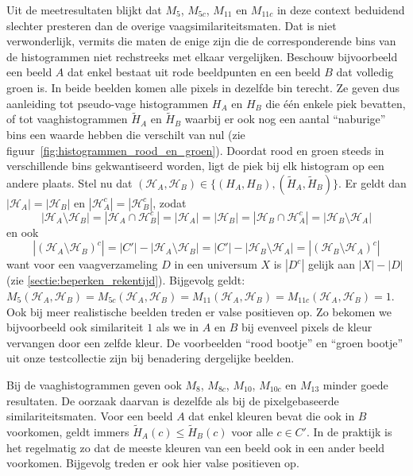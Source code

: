 Uit de meetresultaten blijkt dat $M_5$, $M_{5c}$, $M_{11}$ en $M_{11c}$ in deze context
beduidend slechter presteren dan de overige vaagsimilariteitsmaten. Dat is niet
verwonderlijk, vermits die maten de enige zijn die de corresponderende bins van de histogrammen 
niet rechstreeks met elkaar vergelijken. Beschouw bijvoorbeeld een beeld $A$ dat enkel bestaat
uit rode beeldpunten en een beeld $B$ dat volledig groen is. In beide beelden komen alle
pixels in dezelfde bin terecht. Ze geven dus aanleiding tot pseudo-vage histogrammen $H_A$ en $H_B$  
die \'e\'en enkele piek bevatten, of tot vaaghistogrammen $\widetilde{H}_A$ en $\widetilde{H}_B$ 
waarbij er ook nog een aantal ``naburige'' bins een waarde hebben die verschilt van nul 
(zie figuur~\ref{fig:histogrammen_rood_en_groen}). Doordat rood en 
groen steeds in verschillende bins gekwantiseerd worden, ligt de piek bij elk histogram op een 
andere plaats. 
Stel nu dat $(\mathcal{H}_A,\mathcal{H}_B) \in \{(H_A,H_B), (\widetilde{H}_A,\widetilde{H}_B)\}$.
Er geldt dan
$|\mathcal{H}_A|=|\mathcal{H}_B|$ en $|\mathcal{H}_{A}^c|=|\mathcal{H}_{B}^c|$, zodat
\begin{displaymath}
|\mathcal{H}_A \setminus \mathcal{H}_B|=|\mathcal{H}_A \cap \mathcal{H}_{B}^c|=|\mathcal{H}_A|=|\mathcal{H}_B|=|\mathcal{H}_B \cap \mathcal{H}_{A}^c|=|\mathcal{H}_B \setminus \mathcal{H}_A|
\end{displaymath}
en ook
\begin{displaymath}
|(\mathcal{H}_A  \setminus \mathcal{H}_B)^c|=|C'|-|\mathcal{H}_A \setminus \mathcal{H}_B|=|C'|-|\mathcal{H}_B \setminus \mathcal{H}_A|=|(\mathcal{H}_B  \setminus \mathcal{H}_A)^c|
\end{displaymath}
want voor een vaagverzameling $D$ in een universum $X$ is $|D^c|$ gelijk aan $|X|-|D|$ (zie \ref{sectie:beperken_rekentijd}). Bijgevolg geldt:
$M_5(\mathcal{H}_A,\mathcal{H}_B)=M_{5c}(\mathcal{H}_A,\mathcal{H}_B)=M_{11}(\mathcal{H}_A,\mathcal{H}_B)=M_{11c}(\mathcal{H}_A,\mathcal{H}_B)=1$.
Ook bij meer realistische beelden treden er valse positieven op. Zo bekomen 
we bijvoorbeeld ook similariteit $1$ als we in $A$ en $B$ bij evenveel pixels de kleur vervangen door 
een zelfde kleur. De voorbeelden ``rood bootje'' en ``groen bootje'' uit onze testcollectie zijn bij 
benadering dergelijke beelden. 

Bij de vaaghistogrammen geven ook $M_8$, $M_{8c}$, $M_{10}$, $M_{10c}$ en $M_{13}$ minder goede resultaten.
De oorzaak daarvan is dezelfde als bij de pixelgebaseerde similariteitsmaten. Voor een beeld $A$ dat enkel
kleuren bevat die ook in $B$ voorkomen, geldt immers $\widetilde{H}_A(c) \leq \widetilde{H}_B(c)$ voor 
alle $c \in C'$. In de praktijk is het regelmatig zo dat de meeste kleuren van een beeld ook in een
ander beeld voorkomen. Bijgevolg treden er ook hier valse positieven op.

